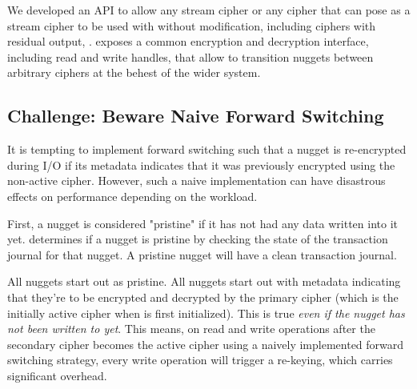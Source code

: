 {
We developed an API to allow any stream cipher or any cipher that can pose as a
stream cipher to be used with \SYSTEM{} without modification, including ciphers
with residual output, .  \SYSTEM{} exposes a common encryption and
decryption interface, including read and write handles, that allow \SYSTEM{} to
transition nuggets between arbitrary ciphers at the behest of the wider system.

\subsection{Challenge: Beware Naive Forward Switching}

It is tempting to implement forward switching such that a nugget is re-encrypted
during I/O if its metadata indicates that it was previously encrypted using the
non-active cipher. However, such a naive implementation can have disastrous
effects on performance depending on the workload.

First, a nugget is considered "pristine" if it has not had any data written into
it yet. \SYSTEM{} determines if a nugget is pristine by checking the state of
the transaction journal for that nugget. A pristine nugget will have a clean
transaction journal.

All nuggets start out as pristine. All nuggets start out with metadata
indicating that they're to be encrypted and decrypted by the primary cipher
(which is the initially active cipher when \SYSTEM{} is first initialized). This
is true \emph{even if the nugget has not been written to yet}. This means, on
read and write operations after the secondary cipher becomes the active cipher
using a naively implemented forward switching strategy, every write operation
will trigger a re-keying, which carries significant overhead.

}
